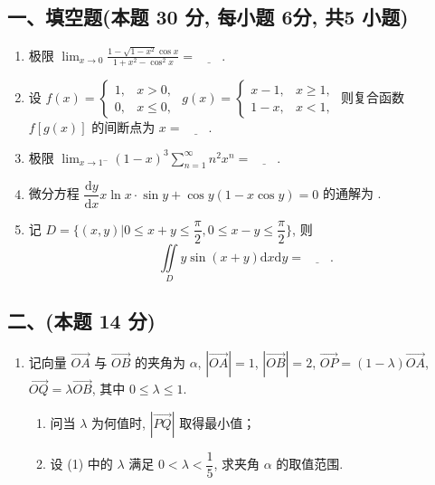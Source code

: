 \subsection*{一、填空题(本题 30 分,  每小题 6分,  共5 小题)}
\begin{enumerate}
    \item 极限 $\displaystyle\lim_{x \to 0} \frac{1 - \sqrt{1 - x^2} \cos x}{1 + x^2 - \cos^2 x} = \underline{\quad\quad}. $
    \item 设 $f(x) = \begin{cases}
                  1, & x > 0,    \\
                  0, & x \leq 0,
              \end{cases}$ $g(x) = \begin{cases}
                  x - 1, & x \geq 1, \\
                  1 - x, & x < 1,
              \end{cases}$ 则复合函数 $f[g(x)]$ 的间断点为 $x = \underline{\quad\quad}.$
    \item 极限 $\displaystyle \lim_{x \to 1^-} (1 - x)^3 \sum_{n=1}^\infty n^2 x^n = \underline{\quad\quad}. $
    \item 微分方程 $ \dfrac{\mathrm{d}y}{\mathrm{d}x} x \ln x \cdot \sin y + \cos y (1 - x \cos y) = 0 $ 的通解为 \underline{\quad\quad}.
    \item 记 $D = \{(x,  y) | 0 \leq x + y \leq \dfrac{\pi}{2},  0 \leq x - y \leq \dfrac{\pi}{2}\}$,  则 \[ \iint\limits_D y \sin(x + y) \mathrm{d}x \mathrm{d}y = \underline{\quad\quad}. \]
\end{enumerate}

\subsection*{二、(本题 14 分)}
\begin{enumerate}[start=6]
    \item 记向量 $\overrightarrow{OA}$ 与 $\overrightarrow{OB}$ 的夹角为 $\alpha$, $|\overrightarrow{OA}| = 1$, $|\overrightarrow{OB}| = 2$, $\overrightarrow{OP} = (1 - \lambda) \overrightarrow{OA}$, $\overrightarrow{OQ} = \lambda \overrightarrow{OB}$, 其中 $0 \leq \lambda \leq 1$.
          \begin{enumerate}
              \item [(1)] 问当 $\lambda$ 为何值时, $|\overrightarrow{PQ}|$ 取得最小值；
              \item [(2)] 设 (1) 中的 $\lambda$ 满足 $0 < \lambda < \dfrac{1}{5}$, 求夹角 $\alpha$ 的取值范围.
          \end{enumerate}
\end{enumerate}

